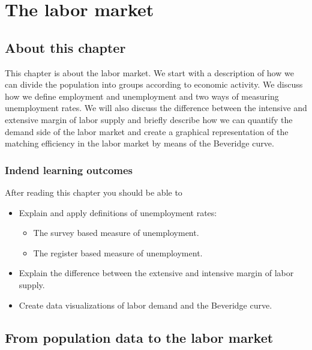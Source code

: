 \documentclass[]{book}
\providecommand{\tightlist}{%
  \setlength{\itemsep}{0pt}\setlength{\parskip}{0pt}}
\begin{document}
\hypertarget{the-labor-market}{%
\chapter{The labor market}\label{the-labor-market}}

\hypertarget{about-this-chapter-5}{%
\section{About this chapter}\label{about-this-chapter-5}}

This chapter is about the labor market. We start with a description of how we can divide the population into groups according to economic activity. We discuss how we define employment and unemployment and two ways of measuring unemployment rates. We will also discuss the difference between the intensive and extensive margin of labor supply and briefly describe how we can quantify the demand side of the labor market and create a graphical representation of the matching efficiency in the labor market by means of the Beveridge curve.

\hypertarget{indend-learning-outcomes}{%
\subsection{Indend learning outcomes}\label{indend-learning-outcomes}}

After reading this chapter you should be able to

\begin{itemize}
\tightlist
\item
  Explain and apply definitions of unemployment rates:

  \begin{itemize}
  \tightlist
  \item
    The survey based measure of unemployment.
  \item
    The register based measure of unemployment.
  \end{itemize}
\item
  Explain the difference between the extensive and intensive margin of labor supply.
\item
  Create data visualizations of labor demand and the Beveridge curve.
\end{itemize}

\hypertarget{from-population-data-to-the-labor-market}{%
\section{From population data to the labor market}\label{from-population-data-to-the-labor-market}}
\end{document}
